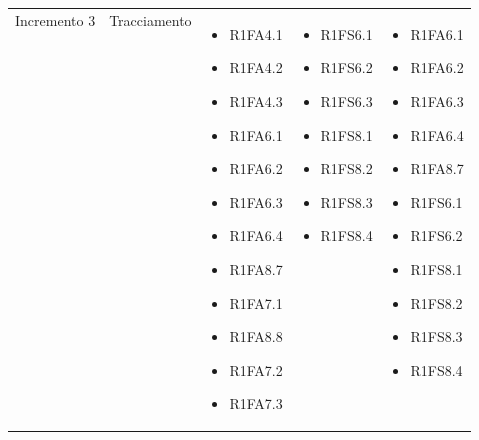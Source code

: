 {\begin{longtable}{C{2.5cm} C{3.2cm} C{2.8cm} C{2.8cm} C{2.8cm}}
Incremento 3 & Tracciamento & \begin{itemize}
    \item[ ] R1FA4.1
    \item[ ] R1FA4.2
    \item[ ] R1FA4.3
    \item[ ] R1FA6.1
    \item[ ] R1FA6.2
    \item[ ] R1FA6.3
    \item[ ] R1FA6.4
    \item[ ] R1FA8.7
    \item[ ] R1FA7.1
    \item[ ] R1FA8.8
    \item[ ] R1FA7.2
    \item[ ] R1FA7.3
\end{itemize}& \begin{itemize} 
    \item[ ] R1FS6.1
    \item[ ] R1FS6.2
    \item[ ] R1FS6.3
    \item[ ] R1FS8.1
    \item[ ] R1FS8.2
    \item[ ] R1FS8.3
    \item[ ] R1FS8.4

\end{itemize} & \begin{itemize} 
    \item[ ] R1FA6.1
    \item[ ] R1FA6.2
    \item[ ] R1FA6.3
    \item[ ] R1FA6.4
    \item[ ] R1FA8.7
    \item[ ] R1FS6.1
    \item[ ] R1FS6.2
    \item[ ] R1FS8.1
    \item[ ] R1FS8.2
    \item[ ] R1FS8.3
    \item[ ] R1FS8.4
\end{itemize}\\


\end{longtable}}
